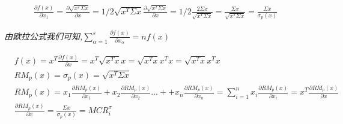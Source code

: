 \documentclass{scrartcl}
\numberwithin{equation}{section}   %
\begin{document}
\begin{equation}
    \begin{aligned}
        \frac{\partial f(x)}{\partial x_1} = \frac{\partial \sqrt{x^T \Sigma  x}}{\partial x}
        = 1/2 \sqrt{x^T \Sigma x} \frac{\partial \sqrt{x^T \Sigma  x}}{\partial x}
        = 1/2 \frac{2 \Sigma x } {\sqrt{x^T \Sigma x} } = \frac{ \Sigma x} {\sqrt{x^T \Sigma  x}} = \frac{ \Sigma x}{\sigma_p(x)}
    \end{aligned}
\end{equation}

\textsl{由欧拉公式我们可知,$\sum_{\alpha=1}^s{\frac{\partial f(x)}{\partial x_{\alpha}}} = n f(x)$}

\begin{equation}
    \begin{aligned}
         & f(x) = x^T \frac{\partial f(x)}{\partial x} = x^T \sqrt{x^T x} x = \sqrt{x^T x}x^T x =\sqrt{x^T x}x^T x                                                                                                                                                  \\
         & RM_p(x) = \sigma_p(x) = \sqrt{x^T \Sigma x}                                                                                                                                                                                                              \\
         & RM_p(x) = x_1 \frac{\partial RM_p(x)}{\partial x_1} + x_2 \frac{\partial RM_p(x)}{\partial x_2} \dots + + x_n \frac{\partial RM_p(x)}{\partial x_n} = \sum_{i=1}^n {x_i \frac{\partial RM_p(x)}{\partial x_i}} = x^T \frac{\partial RM_p(x)}{\partial x} \\
         & \frac{\partial RM_p(x)}{\partial x} =   \frac{ \Sigma x}{\sigma_p(x)} = MCR_i^{\sigma}
    \end{aligned}
\end{equation}
\end{document}
